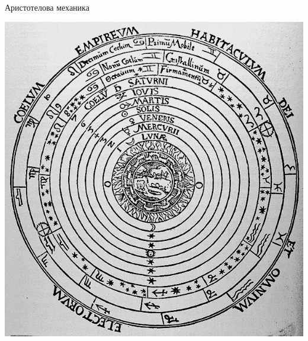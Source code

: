 \documentclass[10pt,a4paper]{beamer}
\begin{document}
        \begin{frame}{ Аристотелова механика }
            \begin{center}
                
                \includegraphics[scale=0.3]{images/aristotel_universe.png}
                
            \end{center}
        \end{frame}
\end{document}

